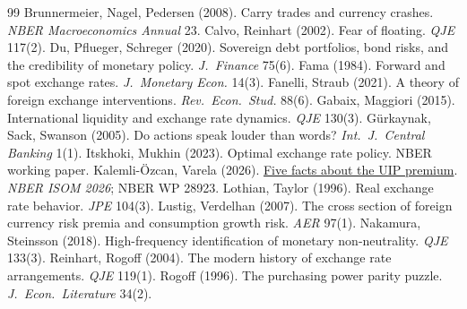 \documentclass[10pt]{article}
\theoremstyle{plain}\newtheorem{proposition}{Proposition}
\theoremstyle{remark}\newtheorem*{remark}{Remark}
\begin{document}
\begingroup\footnotesize
\begin{thebibliography}{99}\setlength{\itemsep}{0pt}\setlength{\parskip}{0pt}
 Brunnermeier, Nagel, Pedersen (2008). Carry trades and currency crashes. \textit{NBER Macroeconomics Annual} 23.
 Calvo, Reinhart (2002). Fear of floating. \textit{QJE} 117(2).
 Du, Pflueger, Schreger (2020). Sovereign debt portfolios, bond risks, and the credibility of monetary policy. \textit{J.\ Finance} 75(6).
 Fama (1984). Forward and spot exchange rates. \textit{J.\ Monetary Econ.} 14(3).
 Fanelli, Straub (2021). A theory of foreign exchange interventions. \textit{Rev.\ Econ.\ Stud.} 88(6).
 Gabaix, Maggiori (2015). International liquidity and exchange rate dynamics. \textit{QJE} 130(3).
 G\"urkaynak, Sack, Swanson (2005). Do actions speak louder than words? \textit{Int.\ J.\ Central Banking} 1(1).
 Itskhoki, Mukhin (2023). Optimal exchange rate policy. NBER working paper.
 Kalemli-\"Ozcan, Varela (2026). \href{https://www.nber.org/papers/w28923}{Five facts about the UIP premium}. \textit{NBER ISOM 2026}; NBER WP 28923.
 Lothian, Taylor (1996). Real exchange rate behavior. \textit{JPE} 104(3).
 Lustig, Verdelhan (2007). The cross section of foreign currency risk premia and consumption growth risk. \textit{AER} 97(1).
 Nakamura, Steinsson (2018). High-frequency identification of monetary non-neutrality. \textit{QJE} 133(3).
 Reinhart, Rogoff (2004). The modern history of exchange rate arrangements. \textit{QJE} 119(1).
 Rogoff (1996). The purchasing power parity puzzle. \textit{J.\ Econ.\ Literature} 34(2).
\end{thebibliography}
\endgroup
\end{document}
